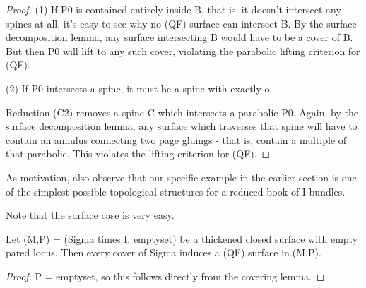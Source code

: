 \begin{proof}
(1) If P0 is contained entirely inside B, that is, it doesn't intersect any
spines at all, it's easy to see why no (QF) surface can intersect B. By the
surface decomposition lemma, any surface intersecting B would have to be
a cover of B. But then P0 will lift to any such cover, violating the parabolic
lifting criterion for (QF).

(2) If P0 intersects a spine, it must be a spine with exactly o

Reduction (C2) removes a spine C which intersects a parabolic P0. Again, by the
surface decomposition lemma, any surface which traverses that spine will have
to contain an annulus connecting two page gluings - that is, contain a multiple
of that parabolic. This violates the lifting criterion for (QF).

\end{proof}

As motivation, also observe that our specific example in the earlier section is
one of the simplest possible topological structures for a reduced book of
I-bundles.

Note that the surface case is very easy.

\begin{prop}

Let (M,P) = (Sigma times I, emptyset) be a thickened closed surface with empty
pared locus. Then every cover of Sigma induces a (QF) surface in.(M,P).

\end{prop}

\begin{proof}

P = emptyset, so this follows directly from the covering lemma.

\end{proof}


